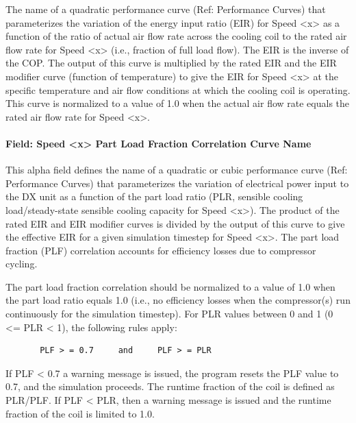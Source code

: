 The name of a quadratic performance curve (Ref: Performance Curves) that parameterizes the variation of the energy input ratio (EIR) for Speed \textless{}x\textgreater{} as a function of the ratio of actual air flow rate across the cooling coil to the rated air flow rate for Speed \textless{}x\textgreater{} (i.e., fraction of full load flow). The EIR is the inverse of the COP. The output of this curve is multiplied by the rated EIR and the EIR modifier curve (function of temperature) to give the EIR for Speed \textless{}x\textgreater{} at the specific temperature and air flow conditions at which the cooling coil is operating. This curve is normalized to a value of 1.0 when the actual air flow rate equals the rated air flow rate for Speed \textless{}x\textgreater{}.

\paragraph{Field: Speed \textless{}x\textgreater{} Part Load Fraction Correlation Curve Name}\label{field-speed-x-part-load-fraction-correlation-curve-name}

This alpha field defines the name of a quadratic or cubic performance curve (Ref: Performance Curves) that parameterizes the variation of electrical power input to the DX unit as a function of the part load ratio (PLR, sensible cooling load/steady-state sensible cooling capacity for Speed \textless{}x\textgreater{}). The product of the rated EIR and EIR modifier curves is divided by the output of this curve to give the effective EIR for a given simulation timestep for Speed \textless{}x\textgreater{}. The part load fraction (PLF) correlation accounts for efficiency losses due to compressor cycling.

The part load fraction correlation should be normalized to a value of 1.0 when the part load ratio equals 1.0 (i.e., no efficiency losses when the compressor(s) run continuously for the simulation timestep). For PLR values between 0 and 1 (0 \textless{}= PLR \textless{} 1), the following rules apply:

\begin{lstlisting}
       PLF > = 0.7     and     PLF > = PLR
\end{lstlisting}

If PLF \textless{} 0.7 a warning message is issued, the program resets the PLF value to 0.7, and the simulation proceeds. The runtime fraction of the coil is defined as PLR/PLF. If PLF \textless{} PLR, then a warning message is issued and the runtime fraction of the coil is limited to 1.0.


